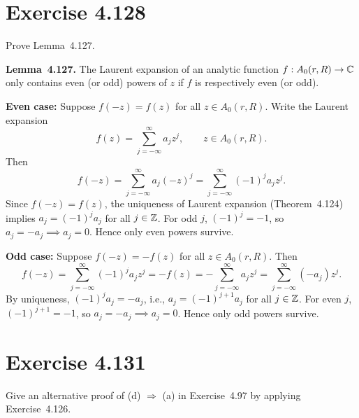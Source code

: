 \documentclass{article}
\begin{document}
\section{Exercise 4.128}

Prove Lemma~4.127.

\begin{solution}
  \textbf{Lemma~4.127.} The Laurent expansion of an analytic function
  $f : A_0(r, R) \to \mathbb{C}$ only contains even (or odd) powers of $z$ if $f$ is
  respectively even (or odd).

  \medskip
  \noindent\textbf{Even case:} Suppose $f(-z) = f(z)$ for all
  $z \in A_0(r, R)$. Write the Laurent expansion
  \[
    f(z) = \sum_{j=-\infty}^{\infty} a_j z^j, \qquad z \in A_0(r, R).
  \]
  Then
  \[
    f(-z) = \sum_{j=-\infty}^{\infty} a_j (-z)^j
    = \sum_{j=-\infty}^{\infty} (-1)^j a_j z^j.
  \]
  Since $f(-z) = f(z)$, the uniqueness of Laurent expansion
  (Theorem~4.124) implies $a_j = (-1)^j a_j$ for all $j \in \mathbb{Z}$.
  For odd $j$, $(-1)^j = -1$, so $a_j = -a_j \implies a_j = 0$.
  Hence only even powers survive.

  \medskip
  \noindent\textbf{Odd case:} Suppose $f(-z) = -f(z)$ for all
  $z \in A_0(r, R)$. Then
  \[
    f(-z) = \sum_{j=-\infty}^{\infty} (-1)^j a_j z^j
    = -f(z) = -\sum_{j=-\infty}^{\infty} a_j z^j
    = \sum_{j=-\infty}^{\infty} (-a_j) z^j.
  \]
  By uniqueness, $(-1)^j a_j = -a_j$, i.e., $a_j = (-1)^{j+1} a_j$ for all
  $j \in \mathbb{Z}$. For even $j$, $(-1)^{j+1} = -1$, so $a_j = -a_j \implies a_j = 0$.
  Hence only odd powers survive.
\end{solution}

\section{Exercise 4.131}

Give an alternative proof of (d) $\Rightarrow$ (a) in Exercise~4.97 by
applying Exercise~4.126.
\end{document}
